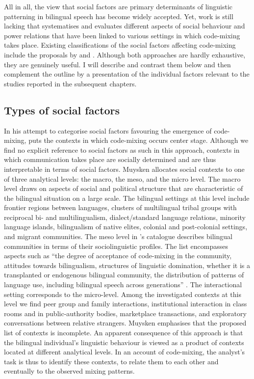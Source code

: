 All in all, the view that social factors are primary determinants of linguistic patterning in bilingual speech has become widely accepted. Yet, work is still lacking that systematises and evaluates different aspects of social behaviour and power relations that have been linked to various settings in which code-mixing takes place. Existing classifications of the social factors affecting code-mixing include the proposals by \citet{muysken-bilingual-2000} and \citet{gardner-chloros_code-switching_2009}. Although both approaches are hardly exhaustive, they are genuinely useful. I will  describe and contrast them below and then complement the outline by a presentation of the individual factors relevant to the studies reported in the subsequent chapters.

\subsection{Types of social factors}
In his attempt to categorise social factors favouring the emergence of code-mixing, \citet[][222--223]{muysken-bilingual-2000} puts the contexts in which code-mixing occurs center stage. Although we find no explicit reference to social factors as such in this approach, contexts in which communication takes place are socially determined and are thus interpretable in terms of social factors. Muysken allocates social contexts to one of three analytical levels: the macro, the meso, and the micro level. The macro level draws on aspects of social and political structure that are characteristic of the bilingual situation on a large scale. The bilingual settings at this level include frontier regions between languages, clusters of multilingual tribal groups with reciprocal bi- and multilingualism, dialect/standard language relations, minority language islands, bilingualism of native elites, colonial and post-colonial settings, and migrant communities. The meso level in \citeauthor{muysken-bilingual-2000}'s catalogue describes bilingual communities in terms of their sociolinguistic profiles. The list encompasses aspects such as ``the degree of acceptance of code-mixing in the community, attitudes towards bilingualism, structures of linguistic domination, whether it is a transplanted or endogenous bilingual community, the distribution of patterns of language use, including bilingual speech across generations'' \citep[][222]{muysken-bilingual-2000}. The interactional setting corresponds to the micro-level. Among the investigated contexts at this level we find peer group and family interactions, institutional interaction in class rooms and in public-authority bodies, marketplace transactions, and exploratory conversations between relative strangers. Muysken emphasises that the proposed list of contexts is incomplete. An apparent consequence of this approach is that the bilingual individual's linguistic behaviour is viewed as a product of contexts located at different analytical levels. In an account of code-mixing, the analyst's task is thus to identify these contexts, to relate them to each other and eventually to the observed mixing patterns.

